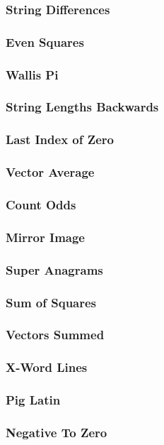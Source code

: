 \subsubsection{String Differences}
\subsubsection{Even Squares}
\subsubsection{Wallis Pi}
\subsubsection{String Lengths Backwards}
\subsubsection{Last Index of Zero}
\subsubsection{Vector Average}
\subsubsection{Count Odds}
\subsubsection{Mirror Image}
\subsubsection{Super Anagrams}
\subsubsection{Sum of Squares}
\subsubsection{Vectors Summed}
\subsubsection{X-Word Lines}
\subsubsection{Pig Latin}
\subsubsection{Negative To Zero}
